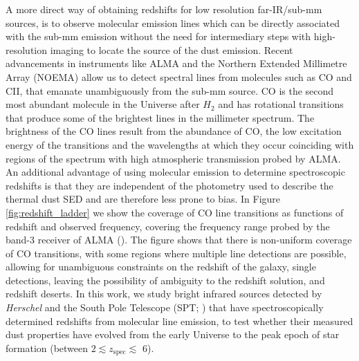 A more direct way of obtaining redshifts for low resolution far-IR/sub-mm sources, is to observe molecular emission lines which can be directly associated with the sub-mm emission without the need for intermediary steps with high-resolution imaging to locate the source of the dust emission. Recent advancements in instruments like ALMA and the Northern Extended Millimetre Array (NOEMA) allow us to detect spectral lines from molecules such as CO and CII, that emanate unambiguously from the sub-mm source. CO is the second most abundant molecule in the Universe after $H_2$ and has rotational transitions that produce some of the brightest lines in the millimeter spectrum. The brightness of the CO lines result from the abundance of CO, the low excitation energy of the transitions and the wavelengths at which they occur coinciding with regions of the spectrum with high atmospheric transmission probed by ALMA. An additional advantage of using molecular emission to determine spectroscopic redshifts is that they are independent of the photometry used to describe the thermal dust SED and are therefore less prone to bias. In Figure \ref{fig:redshift_ladder} we show the coverage of CO line transitions as functions of redshift and observed frequency, covering the frequency range probed by the band-3 receiver of ALMA (\citealt{Weiss_2013}). The figure shows that there is non-uniform coverage of CO transitions, with some regions where multiple line detections are possible, allowing for unambiguous constraints on the redshift of the galaxy, single detections, leaving the possibility of ambiguity to the redshift solution, and redshift deserts. In this work, we study bright infrared sources detected by \textit{Herschel} and the South Pole Telescope (SPT; \citealt{Carlstrom_2011}) that have spectroscopically determined redshifts from molecular line emission, to test whether their measured dust properties have evolved from the early Universe to the peak epoch of star formation (between $2 \lesssim z_{\textrm{spec}} \lesssim$ 6). 

